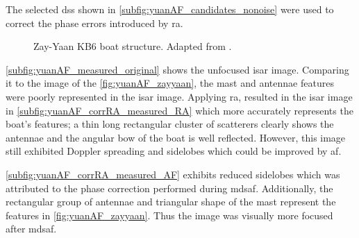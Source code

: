 \documentclass[class=report,11pt,crop=false]{standalone}
\begin{document}
    The selected \gls{ds}s shown in \autoref{subfig:yuanAF_candidates_nonoise} were used to correct the phase errors introduced by \gls{ra}. 
    \begin{figure}
        \centering
        \vspace*{-\baselineskip}
        \caption{Zay-Yaan KB6 boat structure. Adapted from \cite{zayyaan_data}.}
        \label{fig:yuanAF_zayyaan}
        \vspace*{-\baselineskip}
    \end{figure}
    \autoref{subfig:yuanAF_measured_original} shows the unfocused \gls{isar} image. Comparing it to the image of the \autoref{fig:yuanAF_zayyaan}, the mast and antennae features were poorly represented in the \gls{isar} image. Applying \gls{ra}, resulted in the \gls{isar} image in \autoref{subfig:yuanAF_corrRA_measured_RA} which more accurately represents the boat's features; a thin long rectangular cluster of scatterers clearly shows the antennae and the angular bow of the boat is well reflected. However, this image still exhibited Doppler spreading and sidelobes which could be improved by \gls{af}.

    \autoref{subfig:yuanAF_corrRA_measured_AF} exhibits reduced sidelobes which was attributed to the phase correction performed during \gls{mdsaf}. Additionally, the rectangular group of antennae and triangular shape of the mast represent the features in \autoref{fig:yuanAF_zayyaan}. Thus the image was visually more focused after \gls{mdsaf}.
    
\end{document}
